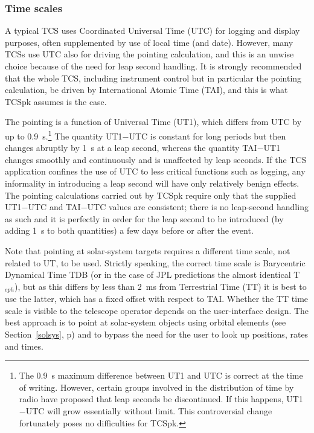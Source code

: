 \documentclass[12pt,fleqn,twoside]{article}
\renewcommand{\_}{{\tt\char'137}}     %
\begin{document}
\subsubsection{Time scales}

A typical TCS uses Coordinated Universal Time (UTC)
for logging and display
purposes, often supplemented by use of local time (and date).  However,
many TCSs use UTC also for driving the pointing
calculation, and this is an unwise choice because of the need for leap
second handling.  It is strongly recommended that the whole TCS,
including instrument control but in particular the pointing
calculation, be driven by International Atomic Time (TAI),
and this is what TCSpk assumes is the case.

The pointing is a function of Universal Time (UT1), which differs
from UTC by up to 0.9~s.\footnote{The 0.9~s maximum
difference between UT1 and UTC is correct at the time of
writing.  However, certain groups involved in the
distribution of time by radio have proposed that leap seconds
be discontinued.  If this happens, UT1$-$UTC will grow essentially
without limit.  This controversial change
fortunately poses no difficulties for TCSpk.}
The quantity UT1$-$UTC is constant
for long periods but then changes
abruptly by 1~s at a leap second, whereas the quantity TAI$-$UT1
changes smoothly and continuously and is unaffected by leap seconds.
If the TCS application confines the use of
UTC to less critical functions such as logging,
any informality in introducing a leap second will have only relatively
benign effects.  The pointing calculations carried out by
TCSpk require only that the supplied UT1$-$UTC and TAI$-$UTC
values are consistent;  there is no leap-second handling
as such and it is
perfectly in order for the leap second to be introduced (by adding 1~s
to both quantities) a few days before or after the event.

Note that pointing at solar-system targets requires a different time
scale, not related to UT, to be used.  Strictly speaking, the correct
time scale is Barycentric Dynamical Time TDB (or in the case of JPL
predictions the almost identical T$_{eph}$), but as this differs by
less than 2~ms from Terrestrial Time (TT) it is best to use the
latter, which has a fixed offset with respect to TAI.  Whether the
TT time scale is visible to the telescope operator depends on the
user-interface design.  The best approach is to point at
solar-system objects using orbital elements (see Section~\ref{solsys},
p\pageref{solsys})
and to bypass the need for the user to look up positions, rates and
times.
\end{document}
